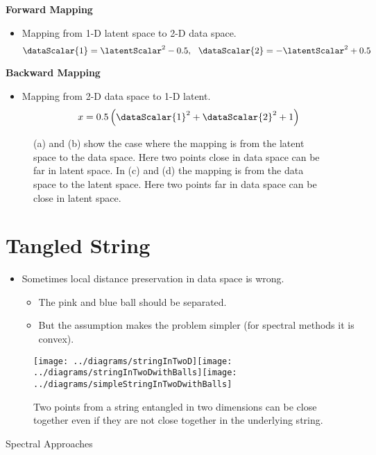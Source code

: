 \textbf{Forward Mapping}
\begin{itemize}
\item Mapping from 1-D latent space to 2-D data space.\[
  \dataScalar{1}=\latentScalar^{2}-0.5,\,\,\,\,\dataScalar{2}=-\latentScalar^{2}+0.5\]

\end{itemize}
\textbf{Backward Mapping}
\begin{itemize}
\item Mapping from 2-D data space to 1-D latent.\[
  x=0.5\left(\dataScalar{1}^{2}+\dataScalar{2}^{2}+1\right)\]

\end{itemize}
% 
\begin{figure}
  \hfill{}

  \hfill{}

  \caption{(a) and (b) show the case where the mapping is from the latent space
    to the data space. Here two points close in data space can be far
    in latent space. In (c) and (d) the mapping is from the data space
    to the latent space. Here two points far in data space can be close
    in latent space. }

\end{figure}


\section{Tangled String}
\begin{itemize}
\item Sometimes local distance preservation in data space is wrong.

  \begin{itemize}
  \item The pink and blue ball should be separated.
  \item But the assumption makes the problem simpler (for spectral methods
    it is convex).
  \end{itemize}

\end{itemize}
\begin{figure}
  \texttt{[image: ../diagrams/stringInTwoD]}\texttt{[image: ../diagrams/stringInTwoDwithBalls]}\texttt{[image: ../diagrams/simpleStringInTwoDwithBalls]}
  \caption{Two points from a string entangled in two dimensions can be close together even if they are not close together in the underlying string.}
\end{figure}
Spectral Approaches

